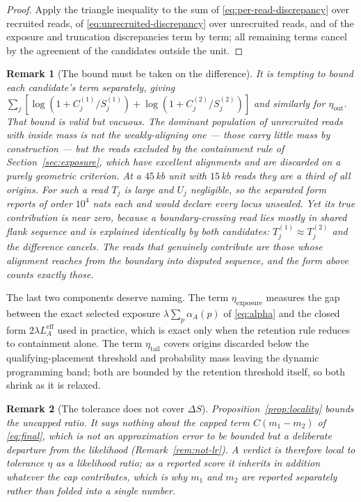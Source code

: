 \documentclass[11pt]{article}
\newtheorem{remark}{Remark}
\begin{document}
\begin{proof}
Apply the triangle inequality to the sum of
\eqref{eq:per-read-discrepancy} over recruited reads, of
\eqref{eq:unrecruited-discrepancy} over unrecruited reads, and of the exposure
and truncation discrepancies term by term; all remaining terms cancel by the
agreement of the candidates outside the unit.
\end{proof}

\begin{remark}[The bound must be taken on the difference]
\label{rem:tight-bound}
It is tempting to bound each candidate's term separately, giving
$\sum_j[\log(1+C^{(1)}_j/S^{(1)}_j) + \log(1+C^{(2)}_j/S^{(2)}_j)]$ and
similarly for $\eta_{\text{out}}$.  That bound is valid but vacuous.  The
dominant population of unrecruited reads with inside mass is not the
weakly-aligning one --- those carry little mass by construction --- but the
reads excluded by the containment rule of Section~\ref{sec:exposure}, which
have excellent alignments and are discarded on a purely geometric criterion.
At a $45$\,kb unit with $15$\,kb reads they are a third of all origins.  For
such a read $T_j$ is large and $U_j$ negligible, so the separated form reports
of order $10^4$ nats each and would declare every locus unsealed.  Yet its true
contribution is near zero, because a boundary-crossing read lies mostly in
shared flank sequence and is explained identically by both candidates:
$T^{(1)}_j \approx T^{(2)}_j$ and the difference cancels.  The reads that
genuinely contribute are those whose alignment reaches from the boundary into
\emph{disputed} sequence, and the form above counts exactly those.
\end{remark}

The last two components deserve naming.  The term $\eta_{\text{exposure}}$
measures the gap between the exact selected exposure $\lambda\sum_p\alpha_A(p)$
of \eqref{eq:alpha} and the closed form $2\lambda L_A^{\mathrm{eff}}$ used in
practice, which is exact only when the retention rule reduces to containment
alone.  The term $\eta_{\text{tail}}$ covers origins discarded below the
qualifying-placement threshold and probability mass leaving the dynamic
programming band; both are bounded by the retention threshold itself, so both
shrink as it is relaxed.

\begin{remark}[The tolerance does not cover $\Delta S$]
\label{rem:eta-scope}
Proposition~\ref{prop:locality} bounds the uncapped ratio.  It says nothing
about the capped term $C(m_1-m_2)$ of \eqref{eq:final}, which is not an
approximation error to be bounded but a deliberate departure from the
likelihood (Remark~\ref{rem:not-lr}).  A verdict is therefore local to
tolerance $\eta$ \emph{as a likelihood ratio}; as a reported score it inherits
in addition whatever the cap contributes, which is why $m_1$ and $m_2$ are
reported separately rather than folded into a single number.
\end{remark}
\end{document}
